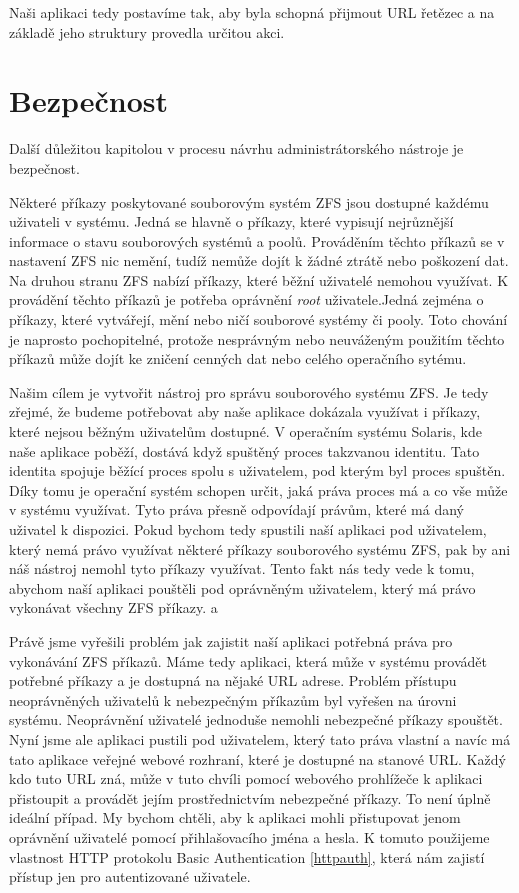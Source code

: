 Naši aplikaci tedy postavíme tak, aby byla schopná přijmout URL řetězec a na základě jeho struktury provedla určitou akci.
\section{Bezpečnost}
Další důležitou kapitolou v procesu návrhu administrátorského nástroje je bezpečnost.

Některé příkazy poskytované souborovým systém ZFS jsou dostupné každému uživateli v systému. Jedná se hlavně o příkazy, které vypisují nejrůznější informace o stavu souborových systémů a poolů. Prováděním těchto příkazů se v nastavení ZFS nic nemění, tudíž nemůže dojít k žádné ztrátě nebo poškození dat. Na druhou stranu ZFS nabízí příkazy, které běžní uživatelé nemohou využívat. K provádění těchto příkazů je potřeba oprávnění \emph{root} uživatele.Jedná zejména o příkazy, které vytvářejí, mění nebo ničí souborové systémy či pooly. Toto chování je naprosto pochopitelné, protože nesprávným nebo neuváženým použitím těchto příkazů může dojít ke zničení cenných dat nebo celého operačního sytému.

Našim cílem je vytvořit nástroj pro správu souborového systému ZFS. Je tedy zřejmé, že budeme potřebovat aby naše aplikace dokázala využívat i příkazy, které nejsou běžným uživatelům dostupné. V operačním systému Solaris, kde naše aplikace poběží, dostává když spuštěný proces takzvanou identitu. Tato identita spojuje běžící proces spolu s uživatelem, pod kterým byl proces spuštěn. Díky tomu je operační systém schopen určit, jaká práva proces má a co vše může v systému využívat. Tyto práva přesně odpovídají právům, které má daný uživatel k dispozici. Pokud bychom tedy spustili naší aplikaci pod uživatelem, který nemá právo využívat některé příkazy souborového systému ZFS, pak by ani náš nástroj nemohl tyto příkazy využívat. Tento fakt nás tedy vede k tomu, abychom naší aplikaci pouštěli pod oprávněným uživatelem, který má právo vykonávat všechny ZFS příkazy. a

Právě jsme vyřešili problém jak zajistit naší aplikaci potřebná práva pro vykonávání ZFS příkazů. Máme tedy aplikaci, která může v systému provádět potřebné příkazy a je dostupná na nějaké URL adrese. Problém přístupu neoprávněných uživatelů k nebezpečným příkazům byl vyřešen na úrovni systému. Neoprávnění uživatelé jednoduše nemohli nebezpečné příkazy spouštět. Nyní jsme ale aplikaci pustili pod uživatelem, který tato práva vlastní a navíc má tato aplikace veřejné webové rozhraní, které je dostupné na stanové URL. Každý kdo tuto URL zná, může v tuto chvíli pomocí webového prohlížeče k aplikaci přistoupit a provádět jejím prostřednictvím nebezpečné příkazy. To není úplně ideální případ. My bychom chtěli, aby k aplikaci mohli přistupovat jenom oprávnění uživatelé pomocí přihlašovacího jména a hesla. K tomuto použijeme vlastnost HTTP protokolu Basic Authentication \ref{httpauth}, která nám zajistí přístup jen pro autentizované uživatele.

